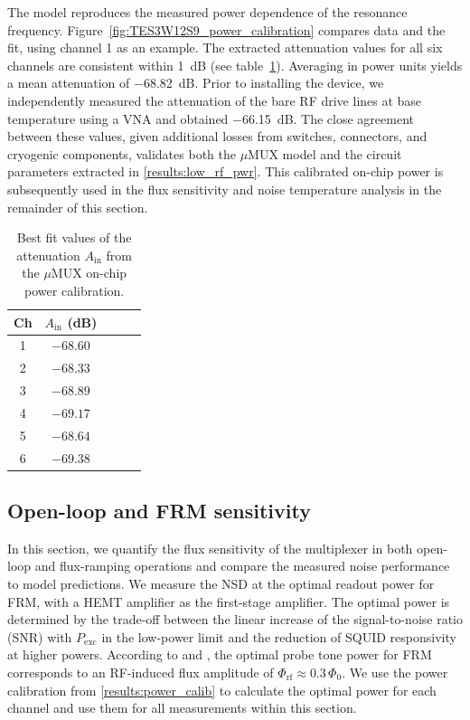 \documentclass[10pt]{iopart}
\newcommand{\uMUX}{$\mu$MUX\xspace}
\begin{document}
The model reproduces the measured power dependence of the resonance frequency. Figure~\ref{fig:TES3W12S9_power_calibration} compares data and the fit, using channel 1 as an example. The extracted attenuation values for all six channels are consistent within \qty{1}{\dB} (see table~\ref{tab:pwr_attenuation}). Averaging in power units yields a mean attenuation of \qty{-68.82}{\dB}. Prior to installing the device, we independently measured the attenuation of the bare RF drive lines at base temperature using a VNA and obtained \qty{-66.15}{\dB}. The close agreement between these values, given additional losses from switches, connectors, and cryogenic components, validates both the \uMUX model and the circuit parameters extracted in \cref{results:low_rf_pwr}. This calibrated on-chip power is subsequently used in the flux sensitivity and noise temperature analysis in the remainder of this section.

\begin{table}[htb]
    \centering
    \begin{tabular}{c c c c c}
    \hline
         \small{Ch} & \small{$A_{\text{in}}$ (dB)}\\
    \hline
    1 & $-68.60$\\
    2 & $-68.33$\\
    3 & $-68.89$\\
    4 & $-69.17$\\
    5 & $-68.64$\\
    6 & $-69.38$\\
    \hline
    \end{tabular}
    \caption{Best fit values of the attenuation $A_{\text{in}}$ from the \uMUX on-chip power calibration.}
    \label{tab:pwr_attenuation}
\end{table}



\subsection{Open-loop and FRM sensitivity} \label{results:HEMT_noise}


In this section, we quantify the flux sensitivity of the multiplexer in both open-loop and flux-ramping operations and compare the measured noise performance to model predictions. We measure the NSD at the optimal readout power for FRM, with a HEMT amplifier as the first-stage amplifier. The optimal power is determined by the trade-off between the linear increase of the signal-to-noise ratio (SNR) with $P_{\mathrm{exc}}$ in the low-power limit and the reduction of SQUID responsivity at higher powers. According to \cite{mates_simultaneous_2017} and \cite{schuster_simulation_2023}, the optimal probe tone power for FRM corresponds to an RF-induced flux amplitude of \mbox{$\Phi_{\mathrm{rf}} \approx 0.3\,\Phi_0$}. We use the power calibration from \cref{results:power_calib} to calculate the optimal power for each channel and use them for all measurements within this section.
\end{document}
